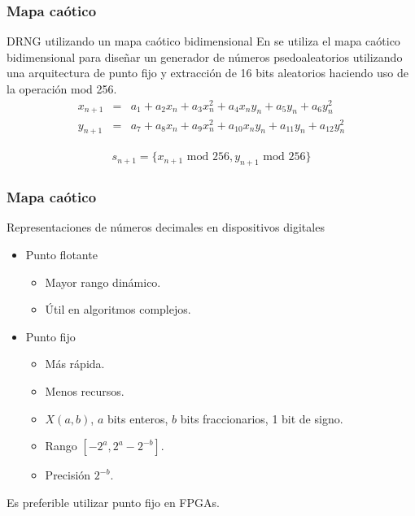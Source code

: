 \documentclass[10pt]{beamer}
\begin{document}
\begin{frame}
    \frametitle{Mapa caótico}
    \begin{block}{DRNG utilizando un mapa caótico bidimensional}
        \justifying
        En \cite{Fraga2021} se utiliza el mapa caótico bidimensional para diseñar un generador de números psedoaleatorios utilizando una arquitectura de punto fijo y extracción de 16 bits aleatorios haciendo uso de la operación mod 256.
        \begin{equation*}
            \begin{array}{ccl}
                x_{n+1} & = &  a_{1} + a_{2}x_{n} + a_{3}x_{n}^{2} + a_{4}x_{n}y_{n} + a_{5}y_{n} + a_{6}y_{n}^{2}\\
                y_{n+1} & = &  a_{7} + a_{8}x_{n} + a_{9}x_{n}^{2} + a_{10}x_{n}y_{n} + a_{11}y_{n} + a_{12}y_{n}^{2}
            \end{array}
	    \end{equation*}
	    
	    \begin{equation}
            \begin{array}{lcl}
                s_{n+1} = \{ x_{n+1} \text{ mod } 256, y_{n+1} \text{ mod } 256 \}
            \end{array}
            \label{eq:extraccion}
        \end{equation}
	\end{block}
\end{frame}



\begin{frame}
    \frametitle{Mapa caótico}
    \begin{block}{Representaciones de números decimales en dispositivos digitales}
        \justifying
         \begin{itemize}
             \item Punto flotante
                 \begin{itemize}
                     \item Mayor rango dinámico.
                     \item Útil en algoritmos complejos.
                 \end{itemize}
             \item Punto fijo
             \begin{itemize}
                     \item Más rápida.
                     \item Menos recursos.
                     \item $X(a,b)$, $a$ bits enteros, $b$ bits fraccionarios, 1 bit de signo.
                     \item Rango $[-2^{a}, 2^{a} - 2^{-b}]$.
                     \item Precisión $2^{-b}$.
                 \end{itemize}
         \end{itemize}
         
         Es preferible utilizar punto fijo en FPGAs.
	\end{block}
\end{frame}
\end{document}
